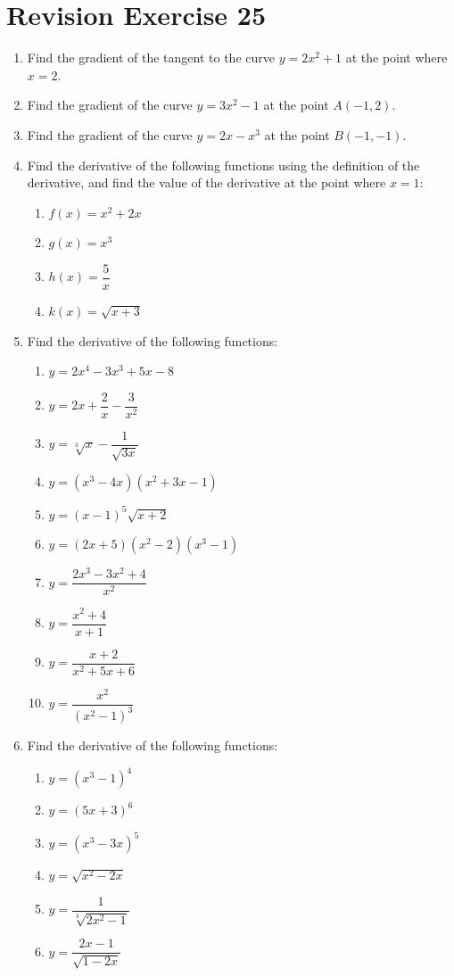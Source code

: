 \documentclass[12pt]{report}
\begin{document}
\section{Revision Exercise 25}

\begin{enumerate}
  \item Find the gradient of the tangent to the curve $y = 2x^2 + 1$ at the point where
        $x = 2$.
  \item Find the gradient of the curve $y = 3x^2 - 1$ at the point $A(-1, 2)$.
  \item Find the gradient of the curve $y = 2x - x^3$ at the point $B(-1, -1)$.
  \item Find the derivative of the following functions using the definition of the
        derivative, and find the value of the derivative at the point where $x = 1$:
        \begin{enumerate}
          \item $f (x) = x^2 + 2x$
          \item $g(x) = x^3$
          \item $h(x) = \dfrac{5}{x}$
          \item $k(x) = \sqrt{x + 3}$
        \end{enumerate}
  \item Find the derivative of the following functions:
        \begin{enumerate}
          \item $y=2x^{4}-3x^{3}+5x-8$
          \item $y=2x+{\dfrac{2}{x}}-{\dfrac{3}{x^{2}}}$
          \item $y=\sqrt[3]{x}-{\dfrac{1}{\sqrt{3x}}}$
          \item $y=\left(x^{3}-4x\right)\left(x^{2}+3x-1\right)$
          \item $y={(x-1)}^{5}{\sqrt{x+2}}$
          \item $y=\left(2x+5\right)\left(x^{2}-2\right)\left(x^{3}-1\right)$
          \item $y={\dfrac{2x^{3}-3x^{2}+4}{x^{2}}}$
          \item $y={\dfrac{x^{2}+4}{x+1}}$
          \item $y={\dfrac{x+2}{x^{2}+5x+6}}$
          \item $y={\dfrac{x^{2}}{{\left(x^{2}-1\right)}^{3}}}$
        \end{enumerate}
  \item Find the derivative of the following functions:
        \begin{enumerate}
          \item $y={\left(x^{3}-1\right)}^{4}$
          \item $y={(5x+3)}^{6}$
          \item $y={\left(x^{3}-3x\right)}^{5}$
          \item $y={\sqrt{x^{2}-2x}}$
          \item $y={\dfrac{1}{\sqrt[3]{2x^{2}-1}}}$
          \item $y={\dfrac{2x-1}{\sqrt{1-2x}}}$
        \end{enumerate}


\end{enumerate}
\end{document}
